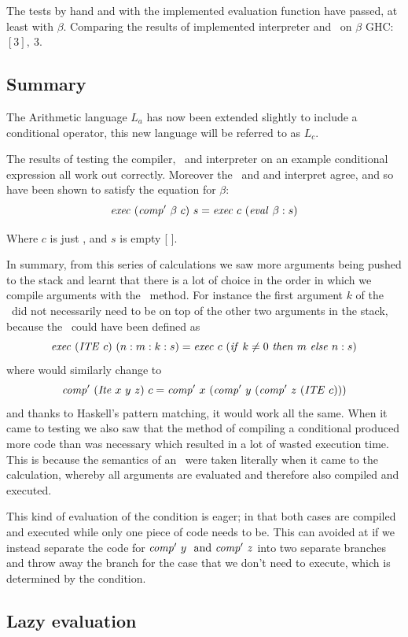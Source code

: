 \documentclass {article}
\begin{document}
The tests by hand and with the implemented evaluation function
have passed, at least with $\beta$.
Comparing the results of  
implemented interpreter and \vm\ on $\beta$
GHC: \( [3],\ 3 \).

\subsection{Summary}

The Arithmetic language $L_a$ has now been extended slightly
to include a conditional operator, this new language will be
referred to as $L_c$.

The results of testing the compiler, \vm\ and interpreter on 
an example conditional expression all work out correctly.
Moreover the \vm\ and and interpret agree, and so
have been shown to satisfy the equation for $\beta$:
\[ \Exec (\Compp \beta\ c)\ s = \Exec c\ (\evalf \beta : s) \]

\noindent Where $c$ is just \HALTt, and $s$ is empty [ ].

In summary, from this series of calculations we saw more
arguments being pushed to the stack and learnt that
there is a lot of choice in the order in which we
compile arguments with the \BH\ method. 
For instance the first argument $k$
of the \ite\ did not necessarily need to be on top
of the other two arguments in the stack, because
the \exec\ could have been defined as
\[ \mathit{exec\ } (\mathit{ITE\ } c)\ (n:m:k:s) 
		= \mathit{exec\ } c\ (\mathit{if\ } k \not= 0\ \mathit{then\ } m\ \mathit{else\ } n:s) \]
\noindent where \compp would similarly change to
\[ \mathit{comp'\ } (\mathit{Ite\ } x\ y\ z)\ c = 
		\mathit{comp'\ }  x\ (\mathit{comp'\ }  y\ (\mathit{comp'\ }  z\ (\mathit{ITE\ } c))) \]
\noindent and thanks to Haskell's pattern matching,
it would work all the same.
When it came to testing we also saw that the method
of compiling a conditional produced more code than was 
necessary which resulted in a lot of wasted
execution time. 
This is because the semantics of an \ite\ were
taken literally when it came to the calculation,
whereby all arguments are evaluated
and therefore also compiled and executed.

This kind of evaluation of the condition
is eager; in that both cases are compiled and executed
while only one piece of code needs to be.
This can avoided at if we instead
separate the code for
\( \mathit{comp'\ }  y\ \mbox{ and } \mathit{comp'\ }  z \) 
into two separate branches
and throw away the branch for the case
that we don't need to execute, which
is determined by the condition.

\pagebreak
\subsection{Lazy evaluation} \label{lazycon}
\end{document}
